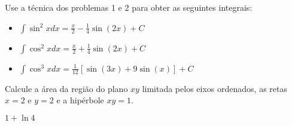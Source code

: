 \begin{exer}Use a técnica dos problemas 1 e 2 para obter as seguintes integrais:
\begin{itemize}
\item $\int \sin^2xdx=\frac{x}{2}-\frac{1}{4}\sin(2x)+C$
\item $\int \cos^2xdx=\frac{x}{2}+\frac{1}{4}\sin(2x)+C$
\item $\int \cos^3xdx=\frac{1}{12}\left[\sin(3x)+9\sin(x)\right]+C$
\end{itemize}
\end{exer}


\begin{exer}Calcule a área da região do plano $xy$ limitada pelos eixos ordenados, as retas $x=2$ e $y=2$ e a hipérbole $xy=1$.
\end{exer}
\begin{resp}
$1+\ln4$ 
\end{resp}


